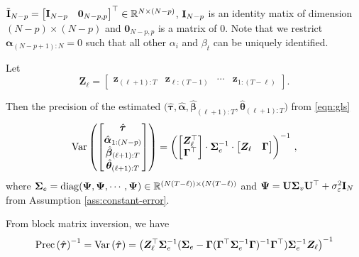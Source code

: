 		$\tilde{\mathbf{I}}_{N-p} = \begin{bmatrix} \mathbf{I}_{N-p} & \mathbf{0}_{N-p,p} \end{bmatrix}^\top  \in \mathbb{R}^{N \times (N-p)}$, $\mathbf{I}_{N-p}$ is an identity matix of dimension $(N-p)\times (N-p)$ and $\mathbf{0}_{N-p,p}$ is a matrix of $0$. Note that we restrict $\bm\alpha_{(N-p+1):N} = 0$ such that all other $\alpha_i$ and $\beta_t$ can be uniquely identified.
		
		Let 
		\[\bm{Z}_\ell = \begin{bmatrix}
		 \bm{z}_{(\ell+1):T} & \bm{z}_{\ell:(T-1)} & \cdots & \bm{z}_{1:(T-\ell)}
		\end{bmatrix}. \]
		
		Then the precision of the estimated $\big( \hat{\bm{\tau}}, \hat{\bm{\alpha}}, \hat{\bm{\beta}}_{(\ell+1):T}, \hat{\bm{\theta}}_{(\ell+1):T} \big)$ from \eqref{eqn:gls}
    \begin{align}\label{eqn:vcov-matrix}
        \mathrm{Var}\left(\begin{bmatrix}
        \hat{\bm{\tau}} \\ \hat{\bm{\alpha}}_{1:(N-p)} \\ \hat{\bm{\beta}}_{(\ell+1):T} \\ \hat{\bm{\theta}}_{(\ell+1):T}
        \end{bmatrix} \right) = \left(\begin{bmatrix}
        \bm{Z}_\ell^\top \\ \bm{\Gamma}^\top 
        \end{bmatrix} 
        \cdot \bm{\Sigma}^{-1}_e \cdot
        \begin{bmatrix}
        \bm{Z}_\ell & \bm{\Gamma}
        \end{bmatrix} \right)^{-1} \, ,
    \end{align}
    where $\bm{\Sigma}_e = \mathrm{diag}(\bm{\Psi}, \bm{\Psi}, \cdots, \bm{\Psi}) \in \mathbb{R}^{(N(T - \ell)) \times (N(T - \ell))}$ and $\bm{\Psi} = \mathbf{U} \mathbf{\Sigma}_v \mathbf{U}^\top + \sigma_\varepsilon^2 \mathbf{I}_N$ from Assumption \ref{ass:constant-error}.
    
    
    From block matrix inversion, we have 
    \begin{align}\label{eqn:precision-matrix}
        \mathrm{Prec}\left( \hat{\bm{\tau}}\right) ^{-1} = \mathrm{Var}\left( \hat{\bm{\tau}}\right) = \left(\bm{Z}_\ell^\top  \bm{\Sigma}^{-1}_e  ( \bm{\Sigma}_e - \bm{\Gamma} (\bm{\Gamma}^\top \bm{\Sigma}^{-1}_e  \bm{\Gamma})^{-1} \bm{\Gamma}^\top) \bm{\Sigma}^{-1}_e  \bm{Z}_\ell \right)^{-1} 
    \end{align}

